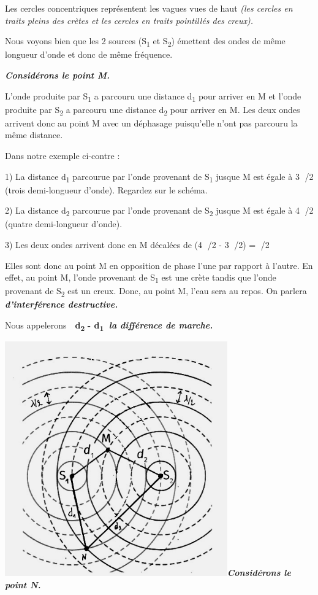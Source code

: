 Les cercles concentriques représentent les vagues vues de haut
\emph{(les cercles en traits pleins des crètes et les cercles en traits
pointillés des creux).}\textbf{ }

Nous voyons bien que les 2 sources (S\textsubscript{1} et
S\textsubscript{2}) émettent des ondes de même longueur d'onde et donc
de même fréquence.

\emph{\textbf{Considérons le point M. }}

L'onde produite par S\textsubscript{1} a parcouru une distance
d\textsubscript{1} pour arriver en M et l'onde produite par
S\textsubscript{2} a parcouru une distance d\textsubscript{2} pour
arriver en M. Les deux ondes arrivent donc au point M avec un déphasage
puisqu'elle n'ont pas parcouru la même distance.

Dans notre exemple ci-contre :

1) La distance d\textsubscript{1} parcourue par l'onde provenant de
S\textsubscript{1} jusque M est égale à 3 /2 (trois demi-longueur
d'onde). Regardez sur le schéma.

2) La distance d\textsubscript{2} parcourue par l'onde provenant de
S\textsubscript{2} jusque M est égale à 4 /2 (quatre demi-longueur
d'onde).

3) Les deux ondes arrivent donc en M décalées de (4 /2 - 3 /2) = /2

Elles sont donc au point M en opposition de phase l'une par rapport à
l'autre. En effet, au point M, l'onde provenant de S\textsubscript{1}
est une crète tandis que l'onde provenant de S\textsubscript{2} est un
creux. Donc, au point M, l'eau sera au repos. On parlera
\emph{\textbf{d'interférence destructive.}}

Nous appelerons \textbf{ d}\textsubscript{\textbf{2 }}\textbf{-
d}\textsubscript{\textbf{1 }}\textbf{}\emph{\textbf{la différence de
marche.}}

\includegraphics[width=9.596cm,height=10.112cm]{Pictures/10000001000001DE000001F885F9EB969C92123B.png}\emph{\textbf{Considérons
le point N. }}

